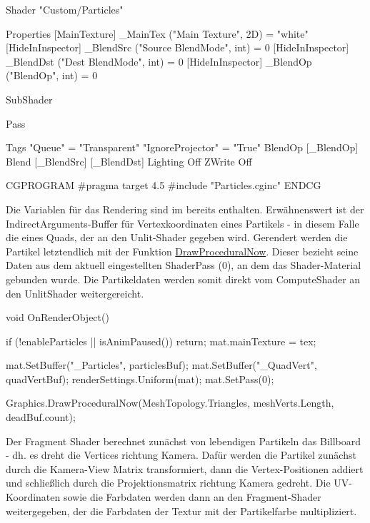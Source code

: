 \begin{csh}[caption=Unlit Partikel-Shader,label=lst:partShader]
Shader "Custom/Particles"
{
    Properties
    {
        [MainTexture] _MainTex ("Main Texture", 2D) = "white" {}
        [HideInInspector] _BlendSrc ("Source BlendMode", int) = 0
        [HideInInspector] _BlendDst ("Dest BlendMode", int) = 0
        [HideInInspector] _BlendOp ("BlendOp", int) = 0
    }

    SubShader
    {
        Pass
        {
            Tags { "Queue" = "Transparent"  "IgnoreProjector" = "True" }
            BlendOp [_BlendOp]
            Blend [_BlendSrc] [_BlendDst]
            Lighting Off
            ZWrite Off
            
            CGPROGRAM
            #pragma target 4.5 %
            #include "Particles.cginc"
            ENDCG
        }
    }
}
\end{csh}

Die Variablen für das Rendering sind im  bereits enthalten. Erwähnenswert ist der IndirectArguments-Buffer für Vertexkoordinaten eines Partikels - in diesem Falle die eines Quads, der an den Unlit-Shader gegeben wird. Gerendert werden die Partikel letztendlich mit der Funktion \href{https://docs.unity3d.com/ScriptReference/Graphics.DrawProceduralNow.html}{DrawProceduralNow}. Dieser bezieht seine Daten aus dem aktuell eingestellten ShaderPass (0), an dem das Shader-Material gebunden wurde. Die Partikeldaten werden somit direkt vom ComputeShader an den UnlitShader weitergereicht.

\begin{csh}[caption=Partikel Rendering]
void OnRenderObject()
{
    if (!enableParticles || isAnimPaused()) return;
    mat.mainTexture = tex;

    mat.SetBuffer("_Particles", particlesBuf);
    mat.SetBuffer("_QuadVert", quadVertBuf);
    renderSettings.Uniform(mat);
    mat.SetPass(0);

    Graphics.DrawProceduralNow(MeshTopology.Triangles, meshVerts.Length, deadBuf.count);
}
\end{csh}

Der Fragment Shader berechnet zunächst von lebendigen Partikeln das Billboard - dh. es dreht die Vertices richtung Kamera. Dafür werden die Partikel zunächst durch die Kamera-View Matrix transformiert, dann die Vertex-Positionen addiert und schließlich durch die Projektionsmatrix richtung Kamera gedreht. Die UV-Koordinaten sowie die Farbdaten werden dann an den Fragment-Shader weitergegeben, der die Farbdaten der Textur mit der Partikelfarbe multipliziert.

